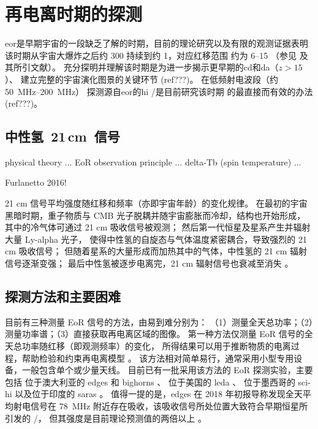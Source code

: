 
\chapter{再电离时期的探测}
\label{chap:detection}


\acf{eor}是早期宇宙的一段缺乏了解的时期，目前的理论研究以及有限的观测证据表明
该时期从宇宙大爆炸之后约 \SI{300}{\Myr} 持续到约 \SI{1}{\Gyr}，对应红移范围
约为 \numrange{6}{15} （参见  及其所引文献）。
充分探明并理解该时期是为进一步揭示更早期的\acl{cd}和\acl{da}（$z > 15$）、
建立完整的宇宙演化图景的关键环节 (ref???)。
在低频射电波段（约 \SIrange{50}{200}{\MHz}）
探测源自\acl{eor}的\acl{hi} \hisignal/是目前研究该时期
的最直接而有效的办法 (ref???)。


\section{中性氢~21\texorpdfstring{\,}{ }cm~信号}
\label{sec:21cm-signal}

physical theory ...
EoR observation principle ...
delta-Tb (spin temperature) ...

Furlanetto 2016!

21 cm 信号平均强度随红移和频率（亦即宇宙年龄）的变化规律。
在最初的宇宙黑暗时期，重子物质与 CMB 光子脱耦并随宇宙膨胀而冷却，结构也开始形成，
其中的冷气体可通过 21 cm 吸收信号被观测；
然后第一代恒星及星系产生并辐射大量 Ly-alpha 光子，
使得中性氢的自旋态与气体温度紧密耦合，导致强烈的 21 cm 吸收信号；
但随着星系的大量形成而加热其中的气体，中性氢的 21 cm 辐射信号逐渐变强；
最后中性氢被逐步电离完，21 cm 辐射信号也衰减至消失
\cite{pritchard2012}。


\section{探测方法和主要困难}
\label{sec:det-methods}

目前有三种测量 EoR 信号的方法，由易到难分别为：
（1）测量全天总功率；（2）测量功率谱；（3）直接获取再电离区域的图像。
第一种方法仅测量 EoR 信号的全天总功率随红移（即观测频率）的变化，
所得结果可以用于推断物质的电离过程，帮助检验和约束再电离模型
\cite{pritchard2012,liu2016}。
该方法相对简单易行，通常采用小型专用设备，一般包含单个或少量天线。
目前已有一批采用该方法的 EoR 探测实验，主要包括
位于澳大利亚的 \ac{edges} \cite{bowman2008} 和
\ac{bighorns} \cite{sokolowski2015}、
位于美国的 \ac{leda} \cite{greenhill2012}、
位于墨西哥的 \ac{sci-hi} \cite{voytek2014}
以及位于印度的 \ac{saras} \cite{singh2018}。
值得一提的是，\acs{edges} 在 2018 年初报导称发现全天平均射电信号在 \SI{78}{\MHz}
附近存在吸收，该吸收信号所处位置大致符合早期恒星所引发的 \hisignal/，
但其强度是目前理论预测值的两倍以上 \cite{bowman2018}。

